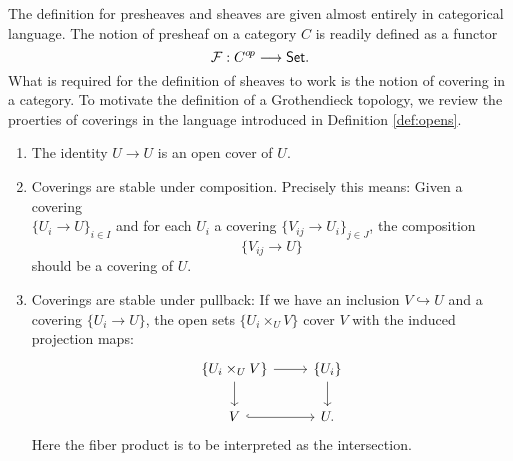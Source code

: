 The definition for presheaves and sheaves are given almost entirely in categorical language. The notion of presheaf on a category $C$ is readily defined as a functor 
\[\mathcal{F}: C^{o\kern-0.10em p}\longrightarrow \mathsf{Set}.\]
What is required for the definition of sheaves to work is the notion of covering in a category. To motivate the definition of a Grothendieck topology, we review the proerties of coverings in the language introduced in Definition \ref{def:opens}.
 \begin{enumerate}
  \item The identity $U \to U$ is an open cover of $U$.
  \item Coverings are stable under composition. Precisely this means: Given a covering \\$\{U_i \to U\}_{i \in I}$ and for each $U_i$ a covering $\{V_{ij} \to U_i\}_{j \in J}$, the composition
        \[\{V_{ij} \to U\}\]
        should be a covering of $U$.
   \item  Coverings are stable under pullback: If we have an inclusion $V \hookrightarrow U$ and a covering $\{U_i \to U\}$, the open sets $\{U_i \times_U V\}$ cover $V$ with the induced projection maps:
      \[\begin{tikzcd}
      	{\{U_i \times_U V\}} & {\{U_i\}} \\
      	V & U.
      	\arrow[from=1-1, to=2-1]
      	\arrow[from=1-1, to=1-2]
      	\arrow[from=1-2, to=2-2]
      	\arrow[hook, from=2-1, to=2-2]
      \end{tikzcd}\]
      Here the fiber product is to be interpreted as the intersection.
\end{enumerate}
\begin{definition}
  
\end{definition}

%
%

